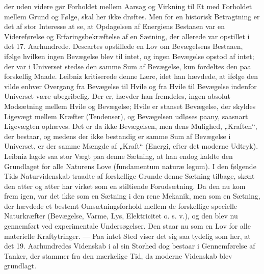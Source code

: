 \documentclass[12pt,a4paper,openany]{book}
\newcommand{\opage}[1]{\marginnote{\footnotesize\textit{[#1]}}}
\begin{document}
der uden videre gør Forholdet mellem Aarsag og Virkning
\opage{28}til Et med Forholdet mellem Grund og Følge, skal her ikke drøftes.
Men for en historisk Betragtning er det af stor Interesse at se, at
Opdagelsen af Energiens Bestaaen var en Videreførelse og Erfaringsbekræftelse
af en Sætning, der allerede var opstillet i det 17. Aarhundrede.
Descartes opstillede en Lov om Bevægelsens Bestaaen,
ifølge hvilken ingen Bevægelse blev til intet, og ingen Bevægelse opstod
af intet; der var i Universet stedse den samme Sum af Bevægelse,
kun fordeltes den paa forskellig Maade. Leibniz kritiserede
denne Lære, idet han hævdede, at ifølge den vilde enhver Overgang
fra Bevægelse til Hvile og fra Hvile til Bevægelse indenfor Universet
være ubegribelig. Der er, hævder han fremdeles, ingen absolut
Modsætning mellem Hvile og Bevægelse; Hvile er stanset Bevægelse,
der skyldes Ligevægt mellem Kræfter (Tendenser), og Bevægelsen
udløses paany, saasnart Ligevægten ophæves. Det er da ikke Bevægelsen,
men dens Mulighed, „Kraften“, der bestaar, og medens der
ikke bestandig er samme Sum af Bevægelse i Universet, er der samme
Mængde af „Kraft“ (Energi, efter det moderne Udtryk). Leibniz
lagde saa stor Vægt paa denne Sætning, at han endog kaldte den
Grundlaget for alle Naturens Love (fundamentum naturæ legum). I
den følgende Tids Naturvidenskab traadte af forskellige Grunde
denne Sætning tilbage, skønt den atter og atter har virket som en
stiltiende Forudsætning. Da den nu kom frem igen, var det ikke som
en Sætning i den rene Mekanik, men som en Sætning, der hævdede
et bestemt Omsætningsforhold mellem de forskellige specielle Naturkræfter
(Bevægelse, Varme, Lys, Elektricitet o. s. v.), og den blev
nu gennemført ved experimentale Undersøgelser. Den staar nu som
en Lov for alle materielle Kraftytringer. --- Paa intet Sted viser det
sig saa tydelig som her, at det 19. Aarhundredes Videnskab i al sin
Storhed dog bestaar i Gennemførelse af Tanker, der stammer fra
den mærkelige Tid, da moderne Videnskab blev grundlagt.
\end{document}
